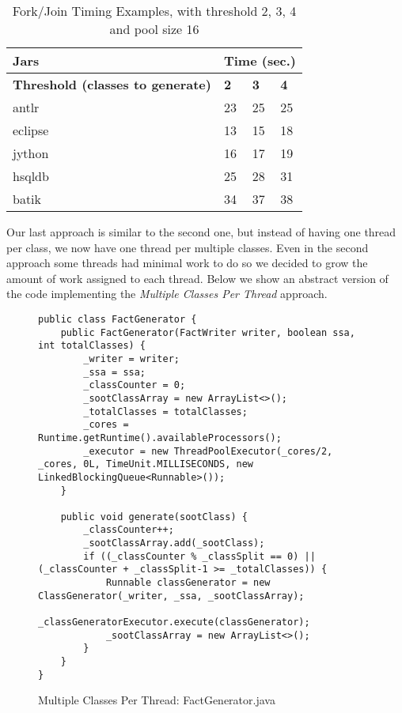 \documentclass{dithesis}
\begin{document}
		\begin{table}[H]
			\centering
            \begin{tabular}{@{}l|lll@{}}
            \toprule
            \textbf{Jars}    	& \multicolumn{3}{l}{\textbf{Time (sec.)}}  \\ \midrule
            \textbf{Threshold (classes to generate)} 	& \textbf{2}  & \textbf{3}  & \textbf{4}  \\ \midrule
            antlr            	& 23          & 25           & 25           \\
            eclipse          	& 13          & 15           & 18           \\
            jython           	& 16          & 17           & 19           \\
            hsqldb           	& 25          & 28           & 31           \\
            batik            	& 34          & 37           & 38           \\ \bottomrule
            \end{tabular}
            \newline
			\caption[Fork/Join Timing Examples]{Fork/Join Timing Examples, with threshold 2, 3, 4 and pool size 16}
		\end{table}



        Our last approach is similar to the second one, but instead of having one thread per class, we now have one thread per multiple classes. Even in the second approach some threads had minimal work to do so we decided to grow the amount of work assigned to each thread. Below we show an abstract version of the code implementing the \textit{Multiple Classes Per Thread} approach.

        \begin{figure}[H]
\begin{lstlisting}
public class FactGenerator {
    public FactGenerator(FactWriter writer, boolean ssa, int totalClasses) {
        _writer = writer;
        _ssa = ssa;
        _classCounter = 0;
        _sootClassArray = new ArrayList<>();
        _totalClasses = totalClasses;
        _cores = Runtime.getRuntime().availableProcessors();
        _executor = new ThreadPoolExecutor(_cores/2, _cores, 0L, TimeUnit.MILLISECONDS, new LinkedBlockingQueue<Runnable>());
    }

    public void generate(sootClass) {
        _classCounter++;
        _sootClassArray.add(_sootClass);
        if ((_classCounter % _classSplit == 0) || (_classCounter + _classSplit-1 >= _totalClasses)) {
            Runnable classGenerator = new ClassGenerator(_writer, _ssa, _sootClassArray);
            _classGeneratorExecutor.execute(classGenerator);
            _sootClassArray = new ArrayList<>();
        }
    }
}
\end{lstlisting}
        \caption{Multiple Classes Per Thread: FactGenerator.java}
        \end{figure}
\end{document}
